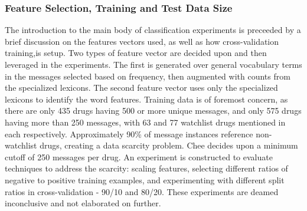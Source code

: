 \documentclass[twoside,11pt]{article}
\begin{document}
\subsubsection{Feature Selection, Training and Test Data Size}
The introduction to the main body of classification experiments is preceeded by a brief discussion on the features vectors used, as well as how cross-validation training,is setup. Two types of feature vector are decided upon and then leveraged in the  experiments. The first is generated over general vocabulary terms in the messages selected based on frequency, then augmented with counts from the specialized lexicons. The second feature vector uses only the specialized lexicons to identify the word features.
Training data is of foremost concern, as there are only 435 drugs having 500 or more unique messages, and only 575 drugs having more than 250 messages, with 63 and 77 watchlist drugs mentioned in each respectively. Approximately 90\% of message instances reference non-watchlist drugs, creating a data scarcity problem. Chee decides upon a minimum cutoff of 250 messages per drug. An experiment is constructed to evaluate techniques to address the scarcity: scaling features, selecting different ratios of negative to positive training examples, and experimenting with different split ratios in cross-validation - 90/10 and 80/20. These experiments are deamed inconclusive and not elaborated on further.
\end{document}
